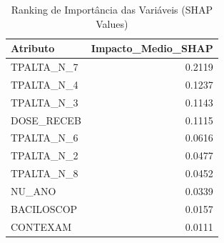 \begin{table}
\caption{Ranking de Importância das Variáveis (SHAP Values)}
\label{tab:shap_importance}
\begin{tabular}{lr}
\toprule
Atributo & Impacto_Medio_SHAP \\
\midrule
TPALTA\_N\_7 & 0.2119 \\
TPALTA\_N\_4 & 0.1237 \\
TPALTA\_N\_3 & 0.1143 \\
DOSE\_RECEB & 0.1115 \\
TPALTA\_N\_6 & 0.0616 \\
TPALTA\_N\_2 & 0.0477 \\
TPALTA\_N\_8 & 0.0452 \\
NU\_ANO & 0.0339 \\
BACILOSCOP & 0.0157 \\
CONTEXAM & 0.0111 \\
\bottomrule
\end{tabular}
\end{table}
